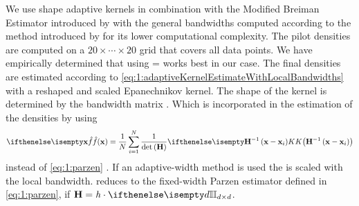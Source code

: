 
	We use shape adaptive kernels in combination with the Modified Breiman Estimator introduced by \textcite{wilkinson1995dataplot} 
	with the general bandwidths computed according to the method introduced by \textcite{ferdosi2011comparison} for its lower computational complexity.
	The pilot densities are computed on a $20 \times \cdots \times 20$ grid that covers all data points.
	We have empirically determined  that using \varMBESensitivityParam =  works best in our case. 
	The final densities are estimated according to \cref{eq:1:adaptiveKernelEstimateWithLocalBandwidths} with a reshaped and scaled Epanechnikov kernel. The shape of the kernel is determined by the bandwidth matrix \varBandwidthMatrix. Which is incorporated in the estimation of the densities by using 
	\begin{equation}\label{eq:2:parzenWithBandWidthMatrix}
		\varEstimatedDensityFunction{\varPattern} = \frac{1}{\varNumPatterns}\sum_{\itXis = 1}^{\varNumPatterns} \frac{1}{\det\left(\varBandwidthMatrix\right)}\varKernel{\varBandwidthMatrix^{-1}\left(\varPattern - \varPattern[\itXis]\right)}
	\end{equation}
	instead of \cref{eq:1:parzen} \cite{hardle2012nonparametric}. If an adaptive-width method is used the \varBandwidthMatrix is scaled with the local bandwidth.  reduces to the fixed-width Parzen estimator defined in \cref{eq:1:parzen}, if $\varBandwidthMatrix = \varBandwidth \cdot \identityMatrix{\varDim}$.
	
